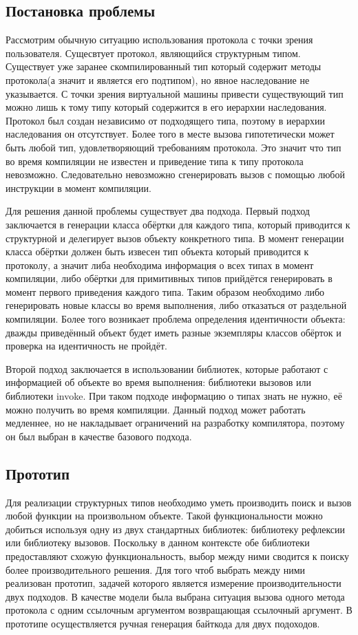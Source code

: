 
\subsection{Постановка проблемы}


Рассмотрим обычную ситуацию использования протокола с точки зрения пользователя. Сущесвтует протокол, являющийся структурным типом. Существует уже заранее скомпилированный тип который содержит методы протокола(а значит и является его подтипом), но явное наследование не указывается. С точки зрения виртуальной машины привести существующий тип можно лишь к тому типу который содержится в его иерархии наследования. Протокол был создан независимо от подходящего типа, поэтому в иерархии наследования он отсутствует. Более того в месте вызова гипотетически может быть любой тип, удовлетворяющий требованиям протокола. Это значит что тип во время компиляции не известен и приведение типа к типу протокола невозможно. Следовательно невозможно сгенерировать вызов с помощью любой инструкции в момент компиляции.

Для решения данной проблемы существует два подхода. Первый подход заключается в генерации класса обёртки для каждого типа, который приводится к структурной и делегирует вызов объекту конкретного типа. В момент генерации класса обёртки должен быть извесен тип объекта который приводится к протоколу, а значит либа необходима информация о всех типах в момент компиляции, либо обёртки для примитивных типов прийдётся генерировать в момент первого приведения каждого типа. Таким образом необходимо либо генерировать новые классы во время выполнения, либо отказаться от раздельной компиляции. Более того возникает проблема определения идентичности объекта: дважды приведённый объект будет иметь разные экземпляры классов обёрток и проверка на идентичность не пройдёт.

Второй подход заключается в использовании библиотек, которые работают с информацией об объекте во время выполнения: библиотеки вызовов или библиотеки invoke. При таком подходе информацию о типах знать не нужно, её можно получить во время компиляции. Данный подход может работать медленнее, но не накладывает ограничений на разработку компилятора, поэтому он был выбран в качестве базового подхода.

\subsection{Прототип}
Для реализации структурных типов необходимо уметь производить поиск и вызов любой функции на произвольном объекте. Такой функциональности можно добиться используя одну из двух стандартных библиотек: библиотеку рефлексии или библиотеку вызовов. Поскольку в данном контексте обе библиотеки предоставляют схожую функциональность, выбор между ними сводится к поиску более производительного решения. Для того чтоб выбрать между ними реализован прототип, задачей которого является измерение производительности двух подходов. В качестве модели была выбрана ситуация вызова одного метода протокола с одним ссылочным аргументом возвращающая ссылочный аргумент. В прототипе осуществляется ручная генерация байткода для двух подоходов.

